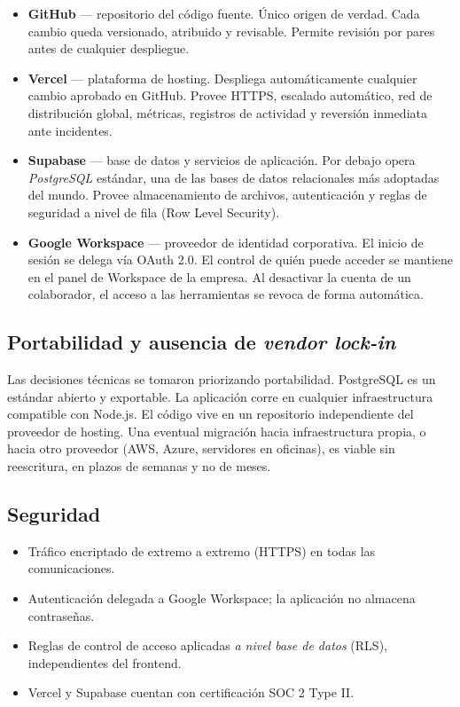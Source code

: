 \documentclass[12pt,a4paper]{article}
\begin{document}
\begin{itemize}
  \item \textbf{GitHub} --- repositorio del código fuente.
        Único origen de verdad. Cada cambio queda versionado, atribuido y revisable.
        Permite revisión por pares antes de cualquier despliegue.
  \item \textbf{Vercel} --- plataforma de hosting.
        Despliega automáticamente cualquier cambio aprobado en GitHub.
        Provee HTTPS, escalado automático, red de distribución global,
        métricas, registros de actividad y reversión inmediata ante incidentes.
  \item \textbf{Supabase} --- base de datos y servicios de aplicación.
        Por debajo opera \emph{PostgreSQL} estándar, una de las bases de datos relacionales
        más adoptadas del mundo.
        Provee almacenamiento de archivos, autenticación
        y reglas de seguridad a nivel de fila (Row Level Security).
  \item \textbf{Google Workspace} --- proveedor de identidad corporativa.
        El inicio de sesión se delega vía OAuth 2.0.
        El control de quién puede acceder se mantiene en el panel de Workspace de la empresa.
        Al desactivar la cuenta de un colaborador, el acceso a las herramientas se revoca
        de forma automática.
\end{itemize}

\subsection*{Portabilidad y ausencia de \emph{vendor lock-in}}

Las decisiones técnicas se tomaron priorizando portabilidad.
PostgreSQL es un estándar abierto y exportable.
La aplicación corre en cualquier infraestructura compatible con Node.js.
El código vive en un repositorio independiente del proveedor de hosting.
Una eventual migración hacia infraestructura propia,
o hacia otro proveedor (AWS, Azure, servidores en oficinas),
es viable sin reescritura, en plazos de semanas y no de meses.

\subsection*{Seguridad}

\begin{itemize}
  \item Tráfico encriptado de extremo a extremo (HTTPS) en todas las comunicaciones.
  \item Autenticación delegada a Google Workspace; la aplicación no almacena contraseñas.
  \item Reglas de control de acceso aplicadas \emph{a nivel base de datos} (RLS),
        independientes del frontend.
  \item Vercel y Supabase cuentan con certificación SOC 2 Type II.
\end{itemize}
\end{document}
